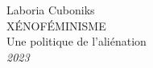 \begin{titlepage}
    \raggedleft
    {\Large Laboria Cuboniks\\[1in]}
    {\Huge\scshape XÉNOFÉMINISME\\[.2in]}
    {\large Une politique de l’aliénation\\}
    \vfill
    {\itshape 2023}
    \end{titlepage}